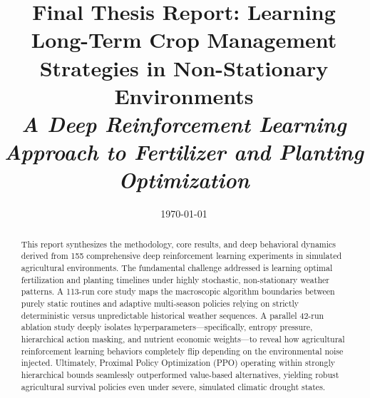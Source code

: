 \documentclass[11pt,a4paper]{report}
\title{
    \vspace{2in}
    \Huge \textbf{Final Thesis Report: Learning Long-Term Crop Management Strategies in Non-Stationary Environments} \\
    \vspace{0.5in}
    \Large \textit{A Deep Reinforcement Learning Approach to Fertilizer and Planting Optimization} \\
    \vspace{0.5in}
}
\author{}
\date{\today}
\begin{document}
\maketitle

\begin{abstract}
This report synthesizes the methodology, core results, and deep behavioral dynamics derived from 155 comprehensive deep reinforcement learning experiments in simulated agricultural environments. The fundamental challenge addressed is learning optimal fertilization and planting timelines under highly stochastic, non-stationary weather patterns. A 113-run core study maps the macroscopic algorithm boundaries between purely static routines and adaptive multi-season policies relying on strictly deterministic versus unpredictable historical weather sequences. A parallel 42-run ablation study deeply isolates hyperparameters—specifically, entropy pressure, hierarchical action masking, and nutrient economic weights—to reveal how agricultural reinforcement learning behaviors completely flip depending on the environmental noise injected. Ultimately, Proximal Policy Optimization (PPO) operating within strongly hierarchical bounds seamlessly outperformed value-based alternatives, yielding robust agricultural survival policies even under severe, simulated climatic drought states. 
\end{abstract}

\tableofcontents
\newpage
\listoffigures
\newpage







\end{document}
